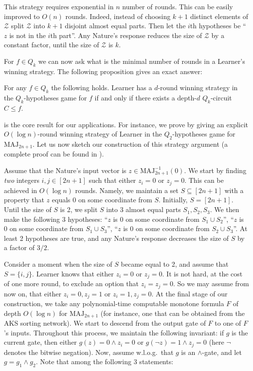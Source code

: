 \documentclass{toc}
\def\MAJ{\mathrm{MAJ}}
\begin{document}
This strategy requires exponential in $n$ number of rounds. This can be easily improved to $O(n)$ rounds. Indeed, instead of choosing $k + 1$ distinct elements of $\mathcal{Z}$ split $\mathcal{Z}$ into $k + 1$ disjoint almost equal parts. Then let the $i$th hypotheses be ``$z$ is not in the $i$th part''. Any Nature's response reduces the size of $\mathcal{Z}$ by a constant factor, until the size of $\mathcal{Z}$ is $k$.

For $f\in Q_k$ we can now ask what is the minimal number of rounds in a Learner's winning strategy. The following proposition gives an exact answer:
\begin{proposition}
\label{games_Q_k}
For any $f\in Q_k$ the following holds. Learner has a $d$-round winning strategy in the $Q_k$-hypotheses game for $f$ if and only if there exists a
depth-$d$ $Q_k$-circuit $C\le f$.
\end{proposition}

 is the core result for our applications. For instance, we prove  by giving an explicit $O(\log n)$-round winning strategy of Learner in the $Q_2$-hypotheses game for $\MAJ_{2n + 1}$. Let us now sketch our construction of this strategy argument (a complete proof can be found in ).

Assume that the Nature's input vector is $z\in\MAJ_{2n + 1}^{-1}(0)$. We start by finding \emph{two} integers $i, j \in [2n + 1]$ such that either $z_i = 0$ or $z_j = 0$. This can be achieved in $O(\log n)$ rounds. Namely, we maintain a set $S\subseteq [2n + 1]$ with a property that $z$ equals $0$ on some coordinate from $S$. Initially, $S = [2n + 1]$. Until the size of $S$ is 2, we split $S$ into 3 almost equal parts $S_1, S_2, S_3$. We then make the following 3 hypotheses: ``$z$ is $0$ on some coordinate from $S_1\cup S_2$'', ``$z$ is $0$ on some coordinate from $S_1\cup S_3$'', ``$z$ is $0$ on some coordinate from $S_2\cup S_3$''. At least 2 hypotheses are true, and any Nature's response decreases the size of $S$ by a factor of $3/2$.

Consider a moment when the size of $S$ became equal to 2, and assume that $S = \{i,j\}$. Learner knows that either $z_i = 0$ or $z_j = 0$.
It is not hard, at the cost of one more round, to exclude an option that $z_i = z_j = 0$. So we may assume from now on, that either $z_i = 0, z_j = 1$ or $z_i = 1, z_j = 0$.
At the final stage of our construction, we take any 
polynomial-time %
computable %
monotone formula $F$ of depth $O(\log n)$  %
for $\MAJ_{2n + 1}$ (for instance, one that can be obtained from the AKS sorting network). We start to descend  from the output gate of $F$ to one of $F$'s inputs. Throughout this process, we maintain the following invariant:  if $g$ is the current gate, then either $g(z) = 0 \land z_i = 0$ or $g(\lnot z) = 1 \land z_j = 0$ (here $\lnot$ denotes the %
bitwise  %
negation). Now, assume w.l.o.g.~that $g$ is an $\land$-gate, and let $g = g_1\land g_2$. Note that among the following 3 statements:
\end{document}
